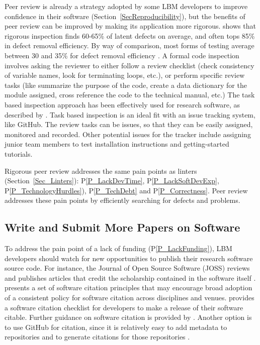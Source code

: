 \documentclass[final, 3p, times, authoryear]{elsarticle}
\newcommand{\ppref}[1]{P\ref{#1}}
\begin{document}
Peer review is already a strategy adopted by some LBM developers to improve
confidence in their software (Section~\ref{SecReproducibility}), but the
benefits of peer review can be improved by making its application more rigorous.
\citet{Jones2008} shows that rigorous inspection finds 60-65\% of latent defects
on average, and often tops 85\% in defect removal efficiency.  By way of
comparison, most forms of testing average between 30 and 35\% for defect removal
efficiency \citep{EbertAndJones2009, Jones2008}.  A formal code inspection
involves asking the reviewer to either follow a review checklist (check
consistency of variable names, look for terminating loops, etc.), or perform
specific review tasks (like summarize the purpose of the code, create a data
dictionary for the module assigned, cross reference the code to the technical
manual, etc.) The task based inspection approach has been effectively used for
research software, as described by \citet{KellyAndShepard2000}. Task based
inspection is an ideal fit with an issue tracking system, like GitHub.  The
review tasks can be issues, so that they can be easily assigned, monitored and
recorded.  Other potential issues for the tracker include assigning junior team
members to test installation instructions and getting-started tutorials.

Rigorous peer review addresses the same pain points as linters
(Section~\ref{Sec_Linters}): \ppref{P_LackDevTime}, \ppref{P_LackSoftDevExp},
\ppref{P_TechnologyHurdles}), \ppref{P_TechDebt} and \ppref{P_Correctness}. Peer
review addresses these pain points by efficiently searching for defects and
problems.

\subsection{Write and Submit More Papers on Software}

To address the pain point of a lack of funding (\ppref{P_LackFunding}), LBM
developers should watch for new opportunities to publish their research software
source code. For instance, the Journal of Open Source Software (JOSS) reviews
and publishes articles that credit the scholarship contained in the software
itself \citep{SmithEtAl2018-joss}.  \citep{SmithEtAl2016-softcite} presents a
set of software citation principles that may encourage broad adoption of a
consistent policy for software citation across disciplines and venues.
\citep{ChueHongEtAl2019} provides a software citation checklist for developers
to make a release of their software citable.  Further guidance on software
citation is provided by \citet{KatzEtAl2021}.  Another option is to use GitHub
for citation, since it is relatively easy to add metadata to repositories and to
generate citations for those repositories \citet{Smith2021-CitationsOnGitHub}.
\end{document}
